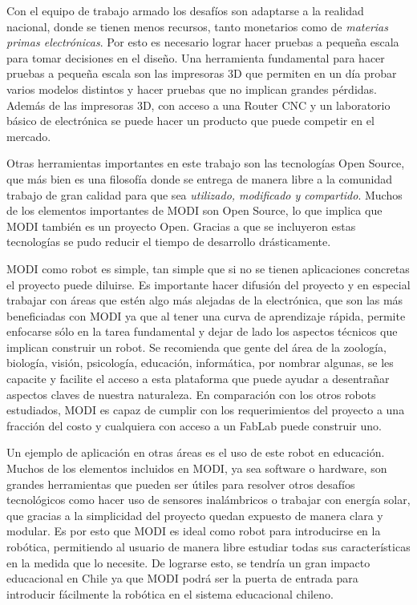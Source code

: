 Con el equipo de trabajo armado los desafíos son adaptarse a la realidad nacional, donde se tienen menos recursos, tanto monetarios como de \textit{materias primas electrónicas}. Por esto es necesario lograr  hacer pruebas a pequeña escala para tomar decisiones en el diseño. Una herramienta fundamental para hacer pruebas a pequeña escala son las impresoras 3D que permiten en un día probar varios modelos distintos y hacer pruebas que no implican grandes pérdidas. Además de las impresoras 3D, con acceso a una Router CNC y un laboratorio básico de electrónica se puede hacer un producto que puede competir en el mercado.

Otras herramientas importantes en este trabajo son las tecnologías Open Source, que más bien es una filosofía donde se entrega de manera libre a la comunidad trabajo de gran calidad para que sea \textit{utilizado, modificado y compartido}. Muchos de los elementos importantes de MODI son Open Source, lo que implica que MODI también es un proyecto Open. Gracias a que se incluyeron estas tecnologías se pudo reducir el tiempo de desarrollo drásticamente.

MODI como robot es simple, tan simple que si no se tienen aplicaciones concretas el proyecto puede diluirse. Es importante hacer difusión del proyecto y en especial trabajar con áreas que estén algo más alejadas de la electrónica, que son las más beneficiadas con MODI ya que al tener una curva de aprendizaje rápida, permite enfocarse sólo en la tarea fundamental y dejar de lado los aspectos técnicos que implican construir un robot. Se recomienda que gente del área de la zoología, biología, visión, psicología, educación, informática, por nombrar algunas, se les capacite y facilite el acceso a esta plataforma que puede ayudar a desentrañar aspectos claves de nuestra naturaleza. En comparación con los otros robots estudiados, MODI es capaz de cumplir con los requerimientos del proyecto a una fracción del costo y cualquiera con acceso a un FabLab puede construir uno.

Un ejemplo de aplicación en otras áreas es el uso de este robot en educación. Muchos de los elementos incluidos en MODI, ya sea software o hardware, son grandes herramientas que pueden ser útiles para resolver otros desafíos tecnológicos como hacer uso de sensores inalámbricos o trabajar con energía solar, que gracias a la simplicidad del proyecto quedan expuesto de manera clara y modular. Es por esto que MODI es ideal como robot para introducirse en la robótica, permitiendo al usuario de manera libre estudiar todas sus características en la medida que lo necesite. De lograrse esto, se tendría un gran impacto educacional en Chile ya que MODI podrá ser la puerta de entrada para introducir fácilmente la robótica en el sistema educacional chileno.